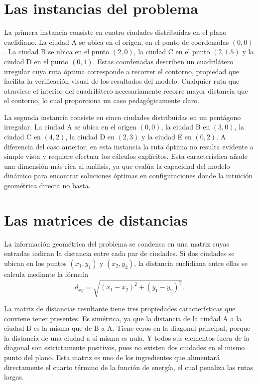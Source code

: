 \documentclass[12pt,a4paper]{article}
\begin{document}
\section{Las instancias del problema}

La primera instancia consiste en cuatro ciudades distribuidas en el plano euclidiano. La ciudad A se ubica en el origen, en el punto de coordenadas $(0, 0)$. La ciudad B se ubica en el punto $(2, 0)$, la ciudad C en el punto $(2, 1.5)$ y la ciudad D en el punto $(0, 1)$. Estas coordenadas describen un cuadrilátero irregular cuya ruta óptima corresponde a recorrer el contorno, propiedad que facilita la verificación visual de los resultados del modelo. Cualquier ruta que atraviese el interior del cuadrilátero necesariamente recorre mayor distancia que el contorno, lo cual proporciona un caso pedagógicamente claro.

La segunda instancia consiste en cinco ciudades distribuidas en un pentágono irregular. La ciudad A se ubica en el origen $(0, 0)$, la ciudad B en $(3, 0)$, la ciudad C en $(4, 2)$, la ciudad D en $(2, 3)$ y la ciudad E en $(0, 2)$. A diferencia del caso anterior, en esta instancia la ruta óptima no resulta evidente a simple vista y requiere efectuar los cálculos explícitos. Esta característica añade una dimensión más rica al análisis, ya que evalúa la capacidad del modelo dinámico para encontrar soluciones óptimas en configuraciones donde la intuición geométrica directa no basta.

\section{Las matrices de distancias}

La información geométrica del problema se condensa en una matriz cuyas entradas indican la distancia entre cada par de ciudades. Si dos ciudades se ubican en los puntos $(x_1, y_1)$ y $(x_2, y_2)$, la distancia euclidiana entre ellas se calcula mediante la fórmula
\begin{equation}
    d_{xy} = \sqrt{(x_1 - x_2)^2 + (y_1 - y_2)^2}.
\end{equation}

La matriz de distancias resultante tiene tres propiedades características que conviene tener presentes. Es simétrica, ya que la distancia de la ciudad A a la ciudad B es la misma que de B a A. Tiene ceros en la diagonal principal, porque la distancia de una ciudad a sí misma es nula. Y todos sus elementos fuera de la diagonal son estrictamente positivos, pues no existen dos ciudades en el mismo punto del plano. Esta matriz es uno de los ingredientes que alimentará directamente el cuarto término de la función de energía, el cual penaliza las rutas largas.
\end{document}
